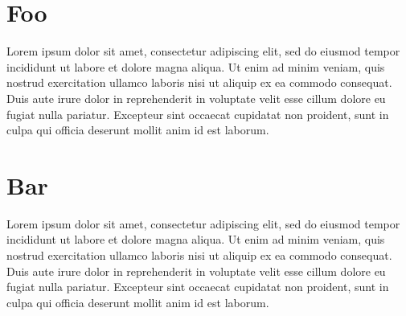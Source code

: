 


\toggletrue{isprint}

\nolinenumbers








\strictpagecheck

\frontmatter
{}







\mainmatter
\pagestyle{myruledpagestyle}

\clearpg
%
\chapter{Foo}
Lorem ipsum dolor sit amet, consectetur adipiscing elit, sed do eiusmod tempor incididunt ut labore et dolore magna aliqua. Ut enim ad minim veniam, quis nostrud exercitation ullamco laboris nisi ut aliquip ex ea commodo consequat. Duis aute irure dolor in reprehenderit in voluptate velit esse cillum dolore eu fugiat nulla pariatur. Excepteur sint occaecat cupidatat non proident, sunt in culpa qui officia deserunt mollit anim id est laborum.
\clearpg
\chapter{Bar}
Lorem ipsum dolor sit amet, consectetur adipiscing elit, sed do eiusmod tempor incididunt ut labore et dolore magna aliqua. Ut enim ad minim veniam, quis nostrud exercitation ullamco laboris nisi ut aliquip ex ea commodo consequat. Duis aute irure dolor in reprehenderit in voluptate velit esse cillum dolore eu fugiat nulla pariatur. Excepteur sint occaecat cupidatat non proident, sunt in culpa qui officia deserunt mollit anim id est laborum.

